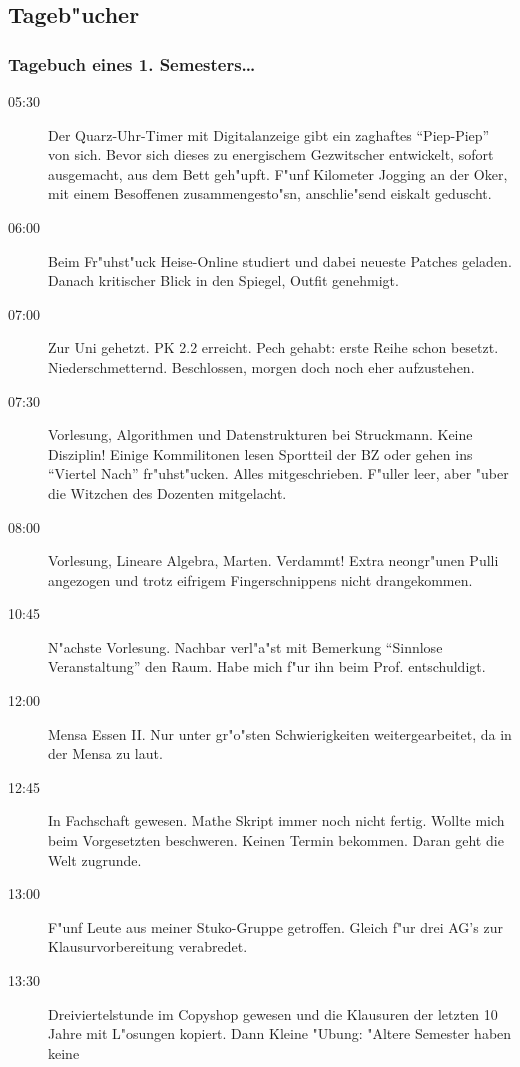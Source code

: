 \subsection{Tageb"ucher}
\subsubsection{Tagebuch eines 1. Semesters\ldots}

\begin{description}
\item[05:30] Der Quarz-Uhr-Timer mit Digitalanzeige gibt ein zaghaftes "`Piep-Piep"'
von sich. Bevor sich dieses zu energischem Gezwitscher entwickelt, sofort
ausgemacht, aus dem Bett geh"upft. F"unf Kilometer Jogging an der Oker,
mit einem Besoffenen zusammengesto"sn, anschlie"send eiskalt geduscht.
\item[06:00] Beim Fr"uhst"uck Heise-Online studiert und dabei neueste Patches geladen.
Danach kritischer Blick in den Spiegel, Outfit genehmigt.
\item[07:00] Zur Uni gehetzt. PK 2.2 erreicht. Pech gehabt: erste Reihe schon besetzt.
Niederschmetternd. Beschlossen, morgen doch noch eher aufzustehen.
\item[07:30] Vorlesung, Algorithmen und Datenstrukturen bei Struckmann. Keine Disziplin!
Einige Kommilitonen lesen
Sportteil der BZ oder gehen ins "`Viertel Nach"' fr"uhst"ucken. Alles
mitgeschrieben. F"uller leer, aber "uber die Witzchen des Dozenten mitgelacht.
\item[08:00] Vorlesung, Lineare Algebra, Marten. Verdammt! Extra neongr"unen Pulli
angezogen und trotz eifrigem Fingerschnippens nicht drangekommen.
\item[10:45] N"achste Vorlesung. Nachbar verl"a"st mit Bemerkung "`Sinnlose
Veranstaltung"' den Raum. Habe mich f"ur ihn beim Prof. entschuldigt.
\item[12:00] Mensa Essen II. Nur unter gr"o"sten Schwierigkeiten
weitergearbeitet, da in der Mensa zu laut.
\item[12:45] In Fachschaft gewesen. Mathe Skript immer noch nicht fertig. Wollte
mich beim Vorgesetzten beschweren. Keinen Termin bekommen. Daran geht die
Welt zugrunde.
\item[13:00] F"unf Leute aus meiner Stuko-Gruppe getroffen. Gleich f"ur drei AG's zur
Klausurvorbereitung verabredet.
\item[13:30] Dreiviertelstunde im Copyshop gewesen und die Klausuren der letzten 10
Jahre mit L"osungen kopiert. Dann Kleine "Ubung: "Altere Semester haben keine

\end{description}
